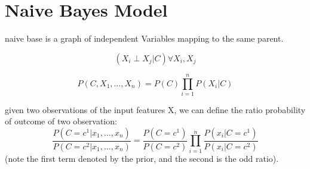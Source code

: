 \documentclass[4apaper,12pt]{book}
\begin{document}
  \section{Naive Bayes Model}
  \begin{description}
  \item naive base is a graph of independent Variables mapping to the  same parent.
  \item {}

  \item $$(X_i \perp X_j | C) \forall X_i,X_j$$
  \item $$P(C,X_1,\dots,X_n) = P(C) \prod_{i=1}^{n}P(X_i|C) $$
  \item given two observations of the input features X, we can define the ratio probability of outcome of two observation: $$
    \frac{P(C=c^1 | x_1,\dots,x_n)}{P(C=c^2 | x_1,\dots,x_n)} = \frac{P(C=c^1)}{P(C=c^2)}\prod_{i=1}^n\frac{P(x_i|C=c^1)}{P(x_i|C=c^2)}$$ (note the first term denoted by the prior, and the second is the odd ratio).

  \end{description}
\end{document}
